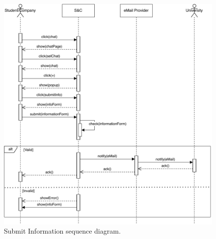 \begin{figure}[H]
    \begin{center}
        \includegraphics[width=\linewidth]{Images/SequenceDiagram/SubmitInformationSD.pdf}
        \caption{Submit Information sequence diagram.}
        \label{fig:submit_info_seqdiag}%
    \end{center}
\end{figure}

\newpage

